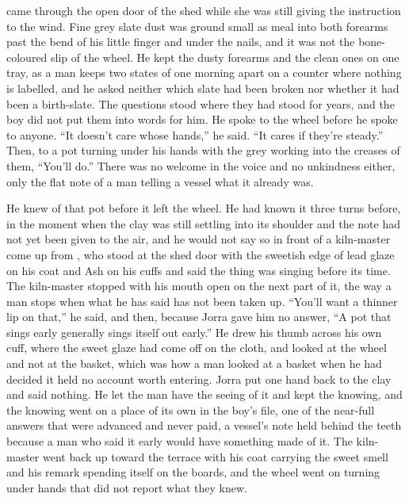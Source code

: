  came through the open door of the shed while she was still giving the instruction to the wind. Fine grey slate dust was ground small as meal into both forearms past the bend of his little finger and under the nails, and it was not the bone-coloured slip of the wheel. He kept the dusty forearms and the clean ones on one tray, as a man keeps two states of one morning apart on a counter where nothing is labelled, and he asked neither which slate had been broken nor whether it had been a birth-slate. The questions stood where they had stood for years, and the boy did not put them into words for him. He spoke to the wheel before he spoke to anyone. “It doesn't care whose hands,” he said. “It cares if they're steady.” Then, to a pot turning under his hands with the grey working into the creases of them, “You'll do.” There was no welcome in the voice and no unkindness either, only the flat note of a man telling a vessel what it already was.

He knew  of that pot before it left the wheel. He had known it three turns before, in the moment when the clay was still settling into its shoulder and the note had not yet been given to the air, and he would not say so in front of a kiln-master come up from , who stood at the shed door with the sweetish edge of lead glaze on his coat and Ash on his cuffs and said the thing was singing before its time. The kiln-master stopped with his mouth open on the next part of it, the way a man stops when what he has said has not been taken up. “You'll want a thinner lip on that,” he said, and then, because Jorra gave him no answer, “A pot that sings early generally sings itself out early.” He drew his thumb across his own cuff, where the sweet glaze had come off on the cloth, and looked at the wheel and not at the basket, which was how a man looked at a basket when he had decided it held no account worth entering. Jorra put one hand back to the clay and said nothing. He let the man have the seeing of it and kept the knowing, and the knowing went on a place of its own in the boy's file, one of the near-full answers that were advanced and never paid, a vessel's note held behind the teeth because a man who said it early would have something made of it. The kiln-master went back up toward the terrace with his coat carrying the sweet smell and his remark spending itself on the boards, and the wheel went on turning under hands that did not report what they knew.

\scenebreak

